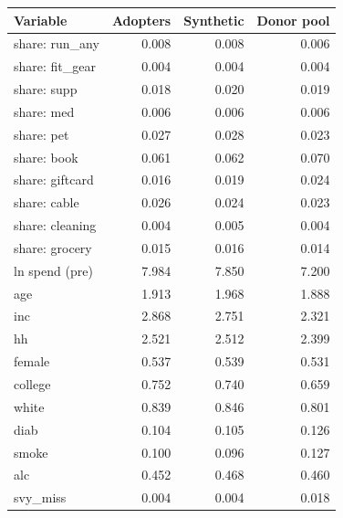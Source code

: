 \begin{tabular}{lrrr}
\toprule
Variable & Adopters & Synthetic & Donor pool \\
\midrule
share: run\_any & 0.008 & 0.008 & 0.006 \\
share: fit\_gear & 0.004 & 0.004 & 0.004 \\
share: supp & 0.018 & 0.020 & 0.019 \\
share: med & 0.006 & 0.006 & 0.006 \\
share: pet & 0.027 & 0.028 & 0.023 \\
share: book & 0.061 & 0.062 & 0.070 \\
share: giftcard & 0.016 & 0.019 & 0.024 \\
share: cable & 0.026 & 0.024 & 0.023 \\
share: cleaning & 0.004 & 0.005 & 0.004 \\
share: grocery & 0.015 & 0.016 & 0.014 \\
ln spend (pre) & 7.984 & 7.850 & 7.200 \\
age & 1.913 & 1.968 & 1.888 \\
inc & 2.868 & 2.751 & 2.321 \\
hh & 2.521 & 2.512 & 2.399 \\
female & 0.537 & 0.539 & 0.531 \\
college & 0.752 & 0.740 & 0.659 \\
white & 0.839 & 0.846 & 0.801 \\
diab & 0.104 & 0.105 & 0.126 \\
smoke & 0.100 & 0.096 & 0.127 \\
alc & 0.452 & 0.468 & 0.460 \\
svy\_miss & 0.004 & 0.004 & 0.018 \\
\bottomrule
\end{tabular}
